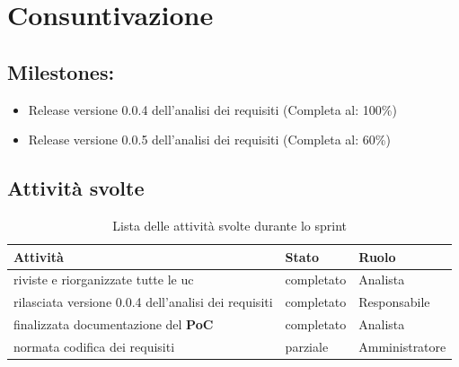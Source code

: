 \section{Consuntivazione}

\subsection{Milestones:}
\begin{itemize}
    \item Release versione 0.0.4 dell'analisi dei requisiti (Completa al: 100\%)
    \item Release versione 0.0.5 dell'analisi dei requisiti (Completa al: 60\%)
\end{itemize}

\subsection{Attività svolte}

\begin{table}[H]
    \begin{xltabular}{\textwidth}{X l l}
        
         \textbf{Attività} & \textbf{Stato} & \textbf{Ruolo}\\
        \endhead
        \hline
        riviste e riorganizzate tutte le uc & completato & Analista \\
        rilasciata versione 0.0.4 dell'analisi dei requisiti & completato & Responsabile \\
        finalizzata documentazione del \textbf{PoC} & completato & Analista \\
        normata codifica dei requisiti & parziale & Amministratore \\
    \end{xltabular}
    \caption{Lista delle attività svolte durante lo sprint}
\end{table}



